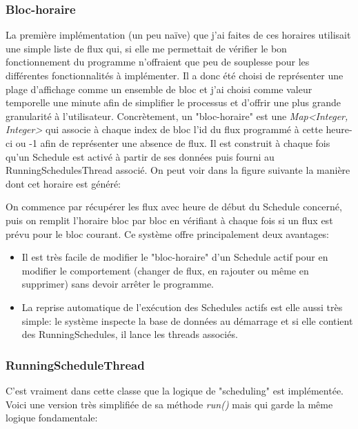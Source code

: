 \documentclass[french]{article}
\begin{document}
\subsubsection{Bloc-horaire}
La première implémentation (un peu naïve) que j'ai faites de ces horaires utilisait une simple liste de flux qui, si elle me permettait de vérifier le bon fonctionnement du programme n'offraient que peu de souplesse pour les différentes fonctionnalités à implémenter. Il a donc été choisi de représenter une plage d'affichage comme un ensemble de bloc et j'ai choisi comme valeur temporelle une minute afin de simplifier le processus et d'offrir une plus grande granularité à l'utilisateur.\newline
Concrètement, un "bloc-horaire" est une \textit{Map<Integer, Integer>} qui associe à chaque index de bloc l'id du flux programmé à cette heure-ci ou -1 afin de représenter une absence de flux. Il est construit à chaque fois qu'un Schedule est activé à partir de ses données puis fourni au RunningSchedulesThread associé. On peut voir dans la figure suivante la manière dont cet horaire est généré:



On commence par récupérer les flux avec heure de début du Schedule concerné, puis on remplit l'horaire bloc par bloc en vérifiant à chaque fois si un flux est prévu pour le bloc courant. \newline
Ce système offre principalement deux avantages: 
\begin{itemize}
	\item Il est très facile de modifier le "bloc-horaire" d'un Schedule actif pour en modifier le comportement (changer de flux, en rajouter ou même en supprimer) sans devoir arrêter le programme.
	\item La reprise automatique de l'exécution des Schedules actifs est elle aussi très simple: le système inspecte la base de données au démarrage et si elle contient des RunningSchedules, il lance les threads associés.
\end{itemize}


 
\subsubsection{RunningScheduleThread}
C'est vraiment dans cette classe que la logique de "scheduling" est implémentée. Voici une version très simplifiée de sa méthode \textit{run()} mais qui garde la même logique fondamentale:
\end{document}
